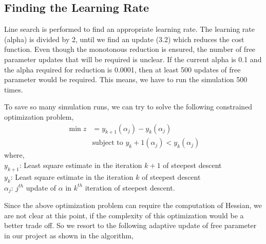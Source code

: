 \documentclass[10pt,a4paper]{report}
\begin{document}


\subsection{Finding the Learning Rate}

Line search is performed to find an appropriate learning rate. The learning rate (alpha) is divided by 2, until we find an update (3.2) which reduces the cost function. Even though the monotonous reduction is ensured, the number of free parameter updates that will be required is unclear. If the current alpha is 0.1 and the alpha required for reduction is 0.0001, then at least 500 updates of free parameter would be required. This means, we have to run the simulation 500 times. 

To save so many simulation runs, we can try to solve the following constrained optimization problem, 
\begin{equation}
	\begin{aligned}
	\min z&= y_{k+1}(\alpha_j)-y_k(\alpha_j) \\  
    &\text{subject to  } y_k+1(\alpha_j)<y_k(\alpha_j)
	\end{aligned}
\end{equation}
where,\\
$y_{k+1}$: Least square estimate in the iteration $k+1$ of steepest descent\\
$y_{k}$: Least square estimate in the iteration $k$ of steepest descent\\
$\alpha_j$: $j^{th}$ update of $\alpha$ in $k^{th}$ iteration of steepest descent.

Since the above optimization problem can require the computation of Hessian,  we are not clear at this point, if the complexity of this optimization would be a better trade off. So we resort to the following adaptive update of free parameter in our project as shown in the algorithm,
\end{document}
